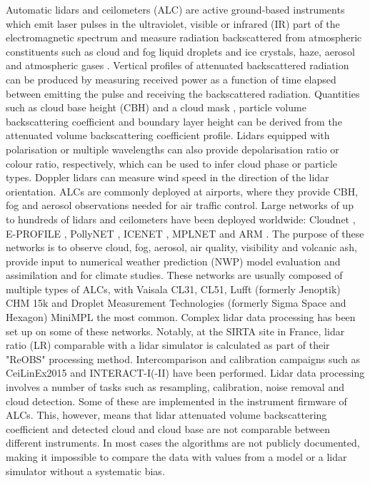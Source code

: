 Automatic lidars and ceilometers (ALC) are active ground-based instruments
which emit laser pulses in the ultraviolet, visible or infrared (IR) part of the
electromagnetic spectrum and measure radiation backscattered from atmospheric
constituents such as cloud and fog liquid droplets and ice crystals, haze,
aerosol and atmospheric gases \citep{emeis2010}.
Vertical profiles of attenuated backscattered radiation can be produced
by measuring received power as a function of time elapsed between emitting the
pulse and receiving the backscattered radiation.  Quantities such as
cloud base height (CBH) and a cloud mask
\citep{pal1992,wang2001,martucci2010,costa-suros2013,tricht2014,liu2015b,liu2015a,lewis2016,cromwell2018,silber2018}, particle volume backscattering coefficient
\citep{marenco1997,welton2000,welton2002,wiegner2012,wiegner2014,jin2015,dionisi2018} and boundary layer height
\citep{eresmaa2006,munkel2007,emeis2009,tsaknakis2011,milroy2012,knepp2017}
can be derived from the attenuated volume
backscattering coefficient profile. Lidars equipped with polarisation or multiple wavelengths
can also provide depolarisation ratio or colour ratio, respectively, which can be used
to infer cloud phase or particle types. Doppler lidars can measure wind
speed in the direction of the lidar orientation. ALCs are commonly deployed
at airports, where they provide CBH, fog and aerosol observations
needed for air traffic control. Large networks of up to
hundreds of lidars and ceilometers have been deployed worldwide: Cloudnet \citep{illingworth2007},
E-PROFILE \citep{illingworth2018}, PollyNET \citep{baars2016},
ICENET \citep{cazorla2017}, MPLNET \citep{welton2006} and ARM \citep{stokes1994,campbell2002}.
The purpose of these networks is to observe cloud, fog, aerosol, air quality,
visibility and volcanic ash, provide input to numerical weather prediction (NWP)
model evaluation \citep{hogan2001,illingworth2007,morcrette2012,warren2018,lamer2018,hansen2019} and
assimilation \citep{illingworth2015a,illingworth2018} and for climate studies.
These networks are usually composed of multiple types of ALCs, with Vaisala CL31,
CL51, Lufft (formerly Jenoptik) CHM 15k and Droplet Measurement Technologies (formerly Sigma Space and Hexagon) MiniMPL
the most common.
Complex lidar data processing has been set up on some of these networks. Notably,
at the SIRTA site in France, lidar ratio (LR)
comparable with a lidar simulator \citep{chiriaco2018} is calculated
as part of their "ReOBS" processing method. Intercomparison and calibration campaigns such as
CeiLinEx2015 \citep{mattis2016} and INTERACT-I(-II)
\citep{rosoldi2018,madonna2018} have been performed.
Lidar data processing involves a number of tasks such as resampling,
calibration, noise removal and cloud detection. Some of these are implemented
in the instrument firmware of ALCs. This, however, means that
lidar attenuated volume backscattering coefficient and detected cloud and cloud base are not comparable
between different instruments. In most cases the algorithms are not publicly
documented, making it impossible to compare the data with values from a model or a lidar simulator
without a systematic bias.

